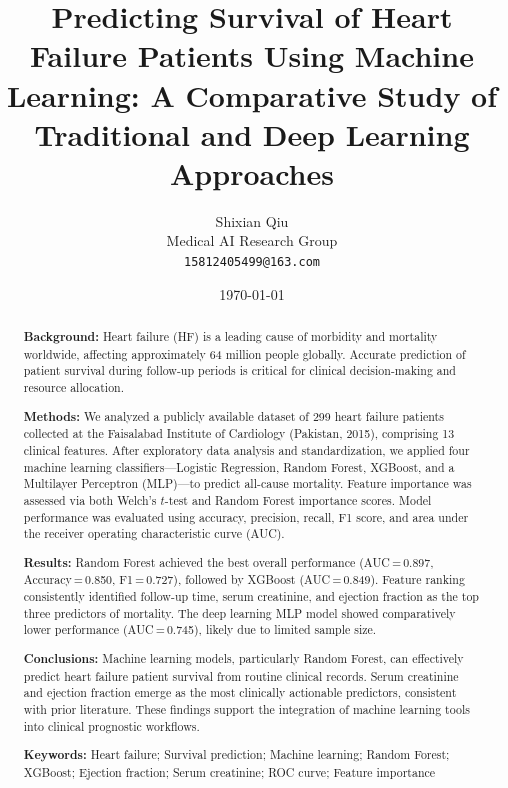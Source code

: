 \documentclass[12pt, a4paper]{article}
\title{Predicting Survival of Heart Failure Patients Using Machine Learning:
A Comparative Study of Traditional and Deep Learning Approaches}
\author{
    Shixian Qiu\\
    \small Medical AI Research Group\\
    \small \texttt{15812405499@163.com}
}
\date{\today}
\begin{document}
\maketitle
\thispagestyle{empty}

\begin{abstract}
\noindent
\textbf{Background:} Heart failure (HF) is a leading cause of morbidity and 
mortality worldwide, affecting approximately 64 million people globally. 
Accurate prediction of patient survival during follow-up periods is critical 
for clinical decision-making and resource allocation.

\noindent
\textbf{Methods:} We analyzed a publicly available dataset of 299 heart failure 
patients collected at the Faisalabad Institute of Cardiology (Pakistan, 2015), 
comprising 13 clinical features. After exploratory data analysis and 
standardization, we applied four machine learning classifiers—Logistic 
Regression, Random Forest, XGBoost, and a Multilayer Perceptron (MLP)—to 
predict all-cause mortality. Feature importance was assessed via both Welch's 
$t$-test and Random Forest importance scores. Model performance was evaluated 
using accuracy, precision, recall, F1 score, and area under the receiver 
operating characteristic curve (AUC).

\noindent
\textbf{Results:} Random Forest achieved the best overall performance 
(AUC\,=\,0.897, Accuracy\,=\,0.850, F1\,=\,0.727), followed by XGBoost 
(AUC\,=\,0.849). Feature ranking consistently identified follow-up time, 
serum creatinine, and ejection fraction as the top three predictors of 
mortality. The deep learning MLP model showed comparatively lower performance 
(AUC\,=\,0.745), likely due to limited sample size.

\noindent
\textbf{Conclusions:} Machine learning models, particularly Random Forest, 
can effectively predict heart failure patient survival from routine clinical 
records. Serum creatinine and ejection fraction emerge as the most clinically 
actionable predictors, consistent with prior literature. These findings support 
the integration of machine learning tools into clinical prognostic workflows.

\medskip
\noindent\textbf{Keywords:} Heart failure; Survival prediction; Machine 
learning; Random Forest; XGBoost; Ejection fraction; Serum creatinine; 
ROC curve; Feature importance
\end{abstract}

\end{document}

